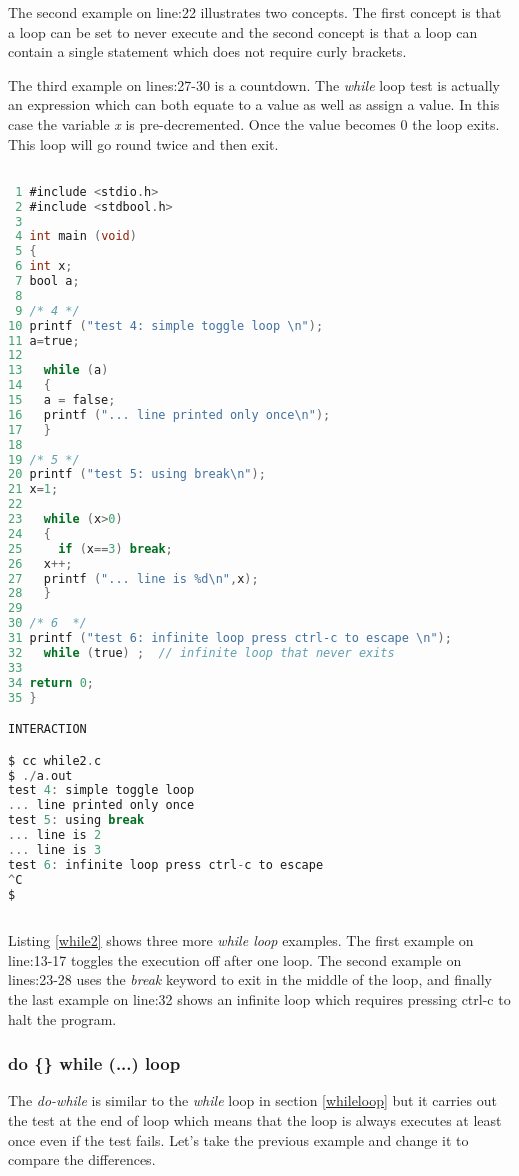The second example on line:22 illustrates two concepts. The first concept is that a loop can be set to never execute and the second concept is that a loop can contain a single statement which does not require curly brackets.

The third example on lines:27-30 is a countdown. The \textit{while} loop test is actually an expression which can both equate to a value as well as assign a value. In this case the variable \textit{x} is pre-decremented. Once the value becomes 0 the loop exits. This loop will go round twice and then exit.

\begin{lstlisting}[language=C,showstringspaces=false,caption={File while2.c, more while...loop examples},captionpos=b,label=while2]

 1 #include <stdio.h>
 2 #include <stdbool.h>
 3 
 4 int main (void)
 5 {
 6 int x;
 7 bool a;
 8 
 9 /* 4 */
10 printf ("test 4: simple toggle loop \n");
11 a=true;
12 
13   while (a)
14   {
15   a = false;
16   printf ("... line printed only once\n");
17   }
18 
19 /* 5 */
20 printf ("test 5: using break\n");
21 x=1;
22 
23   while (x>0)
24   {
25     if (x==3) break;
26   x++;
27   printf ("... line is %d\n",x);
28   }
29 
30 /* 6  */
31 printf ("test 6: infinite loop press ctrl-c to escape \n"); 
32   while (true) ;  // infinite loop that never exits
33 
34 return 0;
35 }

INTERACTION

$ cc while2.c
$ ./a.out
test 4: simple toggle loop 
... line printed only once
test 5: using break
... line is 2
... line is 3
test 6: infinite loop press ctrl-c to escape 
^C
$ 
        
\end{lstlisting}

Listing \ref{while2} shows three more \textit{while loop} examples. The first example on line:13-17 toggles the execution off after one loop. The second example on lines:23-28 uses the \textit{break} keyword to exit in the middle of the loop, and finally the last example on line:32 shows an infinite loop which requires pressing ctrl-c to halt the program. 

\subsubsection{do \{\} while (...) loop}


The \textit{do-while} is similar to the \textit{while} loop in section \ref{whileloop} but it carries out the test at the end of loop which means that the loop is always executes at least once even if the test fails. Let's take the previous example and change it to compare the differences.

